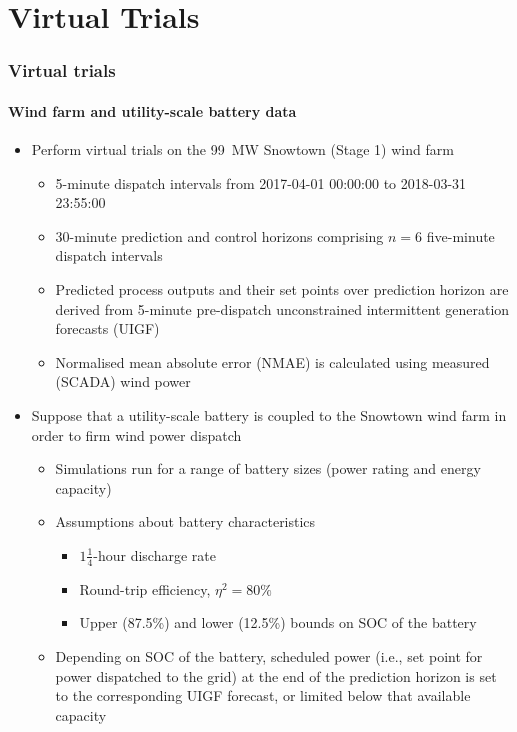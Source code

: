 \documentclass[presentation, smaller, table, svgnames]{beamer}
\begin{document}
\section{Virtual Trials}

\begin{frame}
	\frametitle{Virtual trials}
	\framesubtitle{Wind farm and utility-scale battery data}

	\begin{itemize}
		\item  Perform virtual trials on the 99~MW Snowtown (Stage 1) wind farm
		\begin{itemize}
			\item  5-minute dispatch intervals from 2017-04-01 00:00:00 to 2018-03-31 23:55:00
			\item  30-minute prediction and control horizons comprising $n=6$ five-minute dispatch intervals
			\item  Predicted process outputs and their set points over prediction horizon are derived from 5-minute pre-dispatch unconstrained intermittent generation forecasts (UIGF)
			\item  Normalised mean absolute error (NMAE) is calculated using measured (SCADA) wind power
		\end{itemize}
		
		\item  Suppose that a utility-scale battery is coupled to the Snowtown wind farm in order to firm wind power dispatch
		\begin{itemize}
			\item  Simulations run for a range of battery sizes (power rating and energy capacity) 
			\item  Assumptions about battery characteristics
			\begin{itemize}
				\item  $1\tfrac{1}{4}$-hour discharge rate
				\item  Round-trip efficiency, $\eta^{2} = 80\%$
				\item  Upper (87.5\%) and lower (12.5\%) bounds on SOC of the battery
			\end{itemize}
			\item  Depending on SOC of the battery, scheduled power (i.e., set point for power dispatched to the grid) at the end of the prediction horizon is set to the corresponding UIGF forecast, or limited below that available capacity
		\end{itemize}
				
	\end{itemize}
	
\end{frame}
\end{document}
